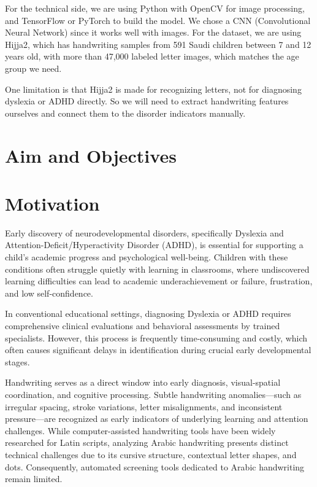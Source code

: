 For the technical side, we are using Python with OpenCV for image processing, and TensorFlow or PyTorch to build the model. We chose a CNN (Convolutional Neural Network) since it works well with images. For the dataset, we are using Hijja2, which has handwriting samples from 591 Saudi children between 7 and 12 years old, with more than 47,000 labeled letter images, which matches the age group we need.

One limitation is that Hijja2 is made for recognizing letters, not for diagnosing dyslexia or ADHD directly. So we will need to extract handwriting features ourselves and connect them to the disorder indicators manually.

\section{Aim and Objectives}
\label{sec:aim}


\section{Motivation}
\label{sec:motivation}

Early discovery of neurodevelopmental disorders, specifically Dyslexia and Attention-Deficit/Hyperactivity Disorder (ADHD), is essential for supporting a child's academic progress and psychological well-being. Children with these conditions often struggle quietly with learning in classrooms, where undiscovered learning difficulties can lead to academic underachievement or failure, frustration, and low self-confidence.

In conventional educational settings, diagnosing Dyslexia or ADHD requires comprehensive clinical evaluations and behavioral assessments by trained specialists. However, this process is frequently time-consuming and costly, which often causes significant delays in identification during crucial early developmental stages.

Handwriting serves as a direct window into early diagnosis, visual-spatial coordination, and cognitive processing. Subtle handwriting anomalies---such as irregular spacing, stroke variations, letter misalignments, and inconsistent pressure---are recognized as early indicators of underlying learning and attention challenges. While computer-assisted handwriting tools have been widely researched for Latin scripts, analyzing Arabic handwriting presents distinct technical challenges due to its cursive structure, contextual letter shapes, and dots. Consequently, automated screening tools dedicated to Arabic handwriting remain limited.

